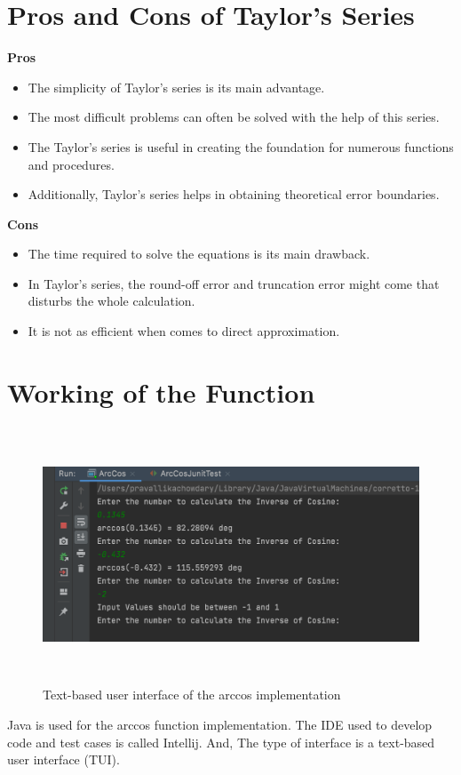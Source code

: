 \documentclass{article}
\begin{document}
    \section{Pros and Cons of Taylor’s Series}
    \textbf{Pros}
    \begin{itemize}
        \item The simplicity of Taylor's series is its main advantage.
        \item The most difficult problems can often be solved with the help of this series.
        \item The Taylor's series is useful in creating the foundation for numerous functions and procedures.
        \item Additionally, Taylor's series helps in obtaining theoretical error boundaries.
    \end{itemize}
    \textbf{Cons}
    \begin{itemize}
        \item The time required to solve the equations is its main drawback.
        \item In Taylor's series, the round-off error and truncation error might come that disturbs the whole calculation.
        \item It is not as efficient when comes to direct approximation.
    \end{itemize}


    \section{Working of the Function}
    \begin{figure}[hbt!]
        \centering
        \includegraphics[width=5.0in,height=3.0in]{Images/JavaImplementation.png}
        \caption{Text-based user interface of the arccos implementation}
        \label{fig:Speed vs. Torque from Pittman}
    \end{figure}
    \par
    Java is used for the arccos function implementation. The IDE used to develop code and test cases is called Intellij. And, The type of interface is a text-based user interface (TUI).
\end{document}
